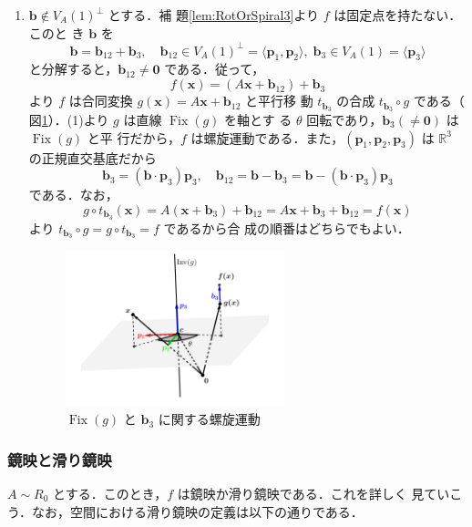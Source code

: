 \documentclass[11pt, uplatex, dvipdfmx, titlepage]{jsarticle}
\makeatletter
\DeclareMathOperator{\Fix}{Fix}
\renewenvironment{proof}[1][\proofname]{\par
  \pushQED{\qed}%
  \normalfont \topsep6\p@\@plus6\p@\relax
  \trivlist
  \item[\hskip\labelsep
         \bfseries
    {#1}]\ignorespaces
}{%
  \popQED\endtrivlist\@endpefalse
}
\theoremstyle{definition}
\renewcommand{\proofname}{\textbf{証明}}
\makeatother
\begin{document}
\begin{proof}[定理\ref{thm:RotOrSpiral3}の証明]
\begin{enumerate}[(1)]
  \item $\bm{b} \notin V_A(1)^{\perp}$ とする．補
    題\ref{lem:RotOrSpiral3}より $f$ は固定点を持たない．このと
    き $\bm{b}$ を
    \[
      \bm{b} = \bm{b}_{12} + \bm{b}_3 , \quad \bm{b}_{12} \in
      V_A(1)^{\perp}=\langle \bm{p}_1, \bm{p}_2 \rangle, \; \bm{b}_{3} \in
      V_A(1)=\langle \bm{p}_3\rangle
    \]
    と分解すると，$\bm{b}_{12} \neq \bm{0}$ である．従って，
    \[
      f(\bm{x}) = \left( A\bm{x} + \bm{b}_{12}\right) + \bm{b}_3
    \]
    より $f$ は合同変換 $g(\bm{x}) = A\bm{x} + \bm{b}_{12}$ と平行移
    動 $t_{\bm{b}_3}$ の合成 $t_{\bm{b}_{3}} \circ g$ である（
    図\ref{fig:spiral3}）．(1)より $g$ は直線 $\Fix(g)$ を軸とす
    る $\theta$ 回転であり，$\bm{b}_3 (\neq \bm{0})$ は $\Fix(g)$ と平
    行だから，$f$ は螺旋運動である．また，$(\bm{p}_1, \bm{p}_2,
    \bm{p}_3)$ は $\mathbb{R}^3$ の正規直交基底だから
    \[
      \bm{b}_{3} = (\bm{b}\cdot  \bm{p}_3) \bm{p}_3,\quad \bm{b}_{12} =
      \bm{b}-\bm{b}_{3} = \bm{b} - (\bm{b}\cdot \bm{p}_3)\bm{p}_3
    \]
    である．なお，
    \[
      g \circ t_{\bm{b}_3} (\bm{x}) = A(\bm{x} + \bm{b}_3) + \bm{b}_{12} =
      A\bm{x} + \bm{b}_3 + \bm{b}_{12} = f(\bm{x})
    \]
    より $t_{\bm{b}_3} \circ g = g \circ t_{\bm{b}_3} = f$ であるから合
    成の順番はどちらでもよい．
    \begin{figure}[h]
      \centering
      \includegraphics[height=4.5cm]{pictures/spiral3.pdf}
      \caption{$\Fix(g)$ と $\bm{b}_3$ に関する螺旋運動}
      \label{fig:spiral3}
    \end{figure}
  \end{enumerate}
\end{proof}

\subsubsection{鏡映と滑り鏡映}\label{sec:RefGlide3}

$A \sim R_0$ とする．このとき，$f$ は鏡映か滑り鏡映である．これを詳しく
見ていこう．なお，空間における滑り鏡映の定義は以下の通りである．
\end{document}
